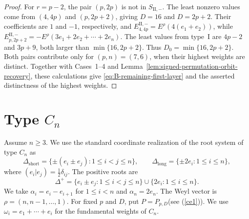 \documentclass[11pt,a4paper]{amsart}
\theoremstyle{plain}
\numberwithin{equation}{section}
\def\leq{\leqslant}
\newenvironment{pf}{\begin{proof}}{\end{proof}}
\begin{document}
\begin{pf}
	For \(r=p-2\), the pair \((p,2p)\) is not in
	\(S_{\mathrm{II},-}\). The least nonzero values come from
	\((4,4p)\) and \((p,2p+2)\), giving \(D=16\) and \(D=2p+2\).
	Their coefficients are \(1\) and \(-1\), respectively, and
	\(E_{4,4p}^{\mathrm{II},-}=E^\rho(4(e_1+e_2))\), while
	\(E_{p,2p+2}^{\mathrm{II},-}
	=-E^\rho(3e_1+2e_2+\cdots+2e_n)\).
	The least values from type~\(\mathrm I\) are \(4p-2\) and
	\(3p+9\), both larger than \(\min\{16,2p+2\}\).
	Thus \(D_0=\min\{16,2p+2\}\). Both pairs contribute only for
	\((p,n)=(7,6)\), when their highest weights are distinct.
	Together with Cases~1--4 and
	Lemma~\ref{lem:signed-permutation-orbit-recovery}, these calculations
	give \eqref{eq:B-remaining-first-layer} and the asserted distinctness
	of the highest weights.
\end{pf}


\section{\texorpdfstring{Type $C_n$}{Type Cn}}\label{sec:type-C}
Assume \(n\ge3\). We use the standard coordinate realization of the root system of type $C_n$ \cite{Humphreys,tauvel2005lie} as
\[
\Delta_{\mathrm{short}}=\{\pm(e_i\pm e_j):1\leq i<j\leq n\},\qquad
\Delta_{\mathrm{long}}=\{\pm2e_i:1\leq i\leq n\},
\]
where \((e_i|e_j)=\tfrac12\delta_{ij}\). The positive roots are
\[
\Delta^+=\{e_i\pm e_j:1\leq i<j\leq n\}\cup\{2e_i:1\leq i\leq n\}.
\]
We take \(\alpha_i=e_i-e_{i+1}\) for \(1\le i<n\) and
\(\alpha_n=2e_n\). The Weyl vector is \(\rho=(n,n-1,\dots,1)\). For fixed
\(p\) and \(D\), put \(P=P_{p,D}\)(see (\ref{ce1})). We use
\(\omega_i=e_1+\cdots+e_i\) for the fundamental weights of \(C_n\).
\end{document}
